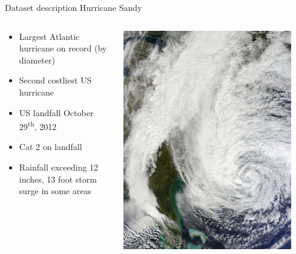 \documentclass[xcolor=svgnames]{beamer}\usepackage[]{graphicx}\usepackage[]{color}
\begin{document}
\begin{frame}{Dataset description}
Hurricane Sandy
\begin{columns}
\begin{column}{0.45\textwidth}
\begin{itemize}
\item Largest Atlantic hurricane on record (by  diameter)
\item Second costliest US hurricane
\item US landfall October 29\textsuperscript{th}, 2012
\item Cat 2 on landfall
\item Rainfall exceeding 12 inches, 13 foot storm surge in some areas
\end{itemize}
\end{column}
\begin{column}{0.45\textwidth}
\centerline{\includegraphics[width = 0.9\textwidth]{Sandy_Oct_28_2012.jpg}}
\end{column}
\end{columns}
\end{frame}
\end{document}
